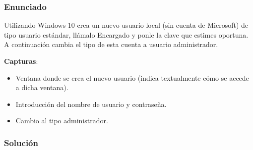\subsubsection{Enunciado}

Utilizando Windows 10 crea un nuevo usuario local (sin cuenta de Microsoft) de tipo usuario estándar, llámalo Encargado y ponle la clave que estimes oportuna. A continuación cambia el tipo de esta cuenta a usuario administrador.

\textbf{Capturas}:

\begin{itemize}
    \item Ventana donde se crea el nuevo usuario (indica textualmente cómo se accede a dicha ventana).
    \item Introducción del nombre de usuario y contraseña.
    \item Cambio al tipo administrador.
\end{itemize}

\subsubsection{Solución}

\newpage



